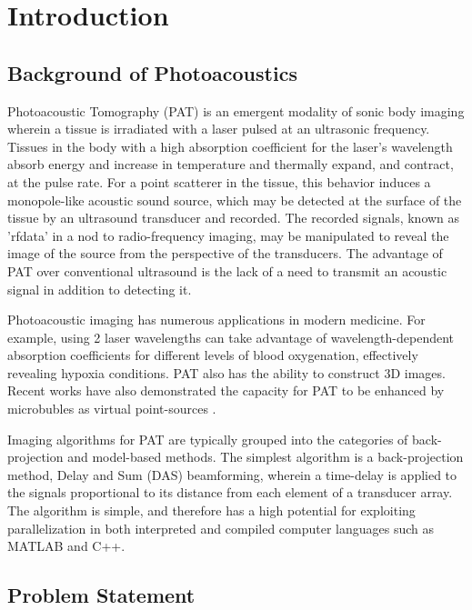 \chapter{Introduction} 
\label{chapter1:introduction}
\graphicspath{{Chapter-1/graphics/}}

\section{Background of Photoacoustics}
\label{chapter1:backg_photoacoustics}

Photoacoustic Tomography (PAT) is an emergent modality of sonic body imaging wherein a tissue is irradiated with a laser pulsed at an ultrasonic frequency. Tissues in the body with a high absorption coefficient for the laser's wavelength absorb energy and increase in temperature and thermally expand, and contract, at the pulse rate. For a point scatterer in the tissue, this behavior induces a monopole-like acoustic sound source, which may be detected at the surface of the tissue by an ultrasound transducer and recorded. The recorded signals, known as 'rfdata' in a nod to radio-frequency imaging, may be manipulated to reveal the image of the source from the perspective of the transducers. The advantage of PAT over conventional ultrasound is the lack of a need to transmit an acoustic signal in addition to detecting it.

Photoacoustic imaging has numerous applications in modern medicine. For example, using 2 laser wavelengths can take advantage of wavelength-dependent absorption coefficients for different levels of blood oxygenation, effectively revealing hypoxia conditions. PAT also has the ability to construct 3D images. Recent works have also demonstrated the capacity for PAT to be enhanced by microbubles as virtual point-sources \cite{tang_high-fidelity_2023}.

Imaging algorithms for PAT are typically grouped into the categories of back-projection and model-based methods. The simplest algorithm is a back-projection method, Delay and Sum (DAS) beamforming, wherein a time-delay is applied to the signals proportional to its distance from each element of a transducer array. The algorithm is simple, and therefore has a high potential for exploiting parallelization in both interpreted and compiled computer languages such as MATLAB and C++.

\section{Problem Statement}
\label{chapter1:problem_statement}


